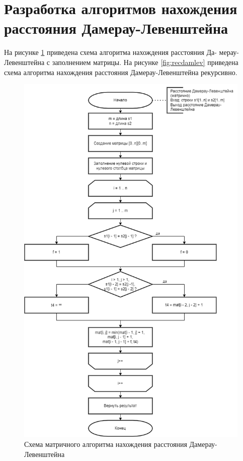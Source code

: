 \section{Разработка алгоритмов нахождения расстояния Дамерау-Левенштейна}
На рисунке \ref{fig:damlevmat} приведена схема алгоритма нахождения расстояния Да- мерау-Левенштейна с заполнением матрицы.
На рисунке \ref{fig:recdamlev} приведена схема алгоритма нахождения расстояния Дамерау-Левенштейна рекурсивно.
\begin{figure}[H]
	\centering
	\includegraphics[width=0.7\linewidth]{inc/img/dam_lev_mat}
	\caption{Схема матричного алгоритма нахождения расстояния Дамерау-Левенштейна}
	\label{fig:damlevmat}
\end{figure}
